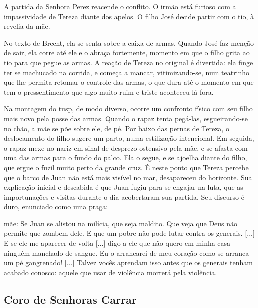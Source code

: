 A partida da Senhora Perez reacende o conflito. O irmão está furioso com
a impassividade de Tereza diante dos apelos. O filho José decide partir
com o tio, à revelia da mãe.

No texto de Brecht, ela se senta sobre a caixa de armas. Quando José faz
menção de sair, ela corre até ele e o abraça fortemente, momento em que
o filho grita ao tio para que pegue as armas. A reação de Tereza no
original é divertida: ela finge ter se machucado na corrida, e começa a
mancar, vitimizando-se, num teatrinho que lhe permita retomar o controle
das armas, o que dura até o momento em que tem o pressentimento que algo
muito ruim e triste aconteceu lá fora.

Na montagem do {\sc tusp}, de modo diverso, ocorre um confronto físico com seu
filho mais novo pela posse das armas. Quando o rapaz tenta pegá-las,
esgueirando-se no chão, a mãe se põe sobre ele, de pé. Por baixo das
pernas de Tereza, o deslocamento do filho sugere um parto, numa
estilização intencional. Em seguida, o rapaz mexe no nariz em sinal de
desprezo ostensivo pela mãe, e se afasta com uma das armas para o fundo
do palco. Ela o segue, e se ajoelha diante do filho, que ergue o fuzil
muito perto da grande cruz. É neste ponto que Tereza percebe que o barco
de Juan não está mais visível no mar, desapareceu do horizonte. Sua
explicação inicial e descabida é que Juan fugiu para se engajar na luta,
que as importunações e visitas durante o dia acobertaram sua partida.
Seu discurso é duro, enunciado como uma praga:


{\sc mãe}: Se Juan se alistou na milícia, que seja maldito. Que veja que Deus
não permite que zombem dele. E que um pobre não pode lutar contra os
generais. {[}...{]} E se ele me aparecer de volta {[}...{]} digo a ele
que não quero em minha casa ninguém manchado de sangue. Eu o arrancarei
de meu coração como se arranca um pé gangrenado! {[}...{]} Talvez vocês
aprendam isso antes que os generais tenham acabado conosco: aquele que
usar de violência morrerá pela violência.


\subsection{Coro de Senhoras Carrar}

